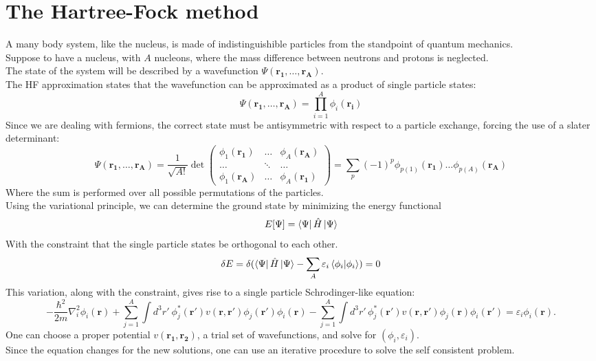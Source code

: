 \section{The Hartree-Fock method}
A many body system, like the nucleus, is made of indistinguishible particles from the standpoint of quantum mechanics.
\\Suppose to have a nucleus, with $A$ nucleons, where the mass difference between neutrons and protons is neglected.
\\The state of the system will be described by a wavefunction $\Psi(\mathbf{r_1}, \ldots, \mathbf{r_A})$.
\\The HF approximation states that the wavefunction can be approximated as a product of single particle states:
\begin{equation}
    \Psi(\mathbf{r_1}, \ldots, \mathbf{r_A}) = \prod_{i=1}^A \phi_i(\mathbf{r_i})
\end{equation}
Since we are dealing with fermions, the correct state must be antisymmetric with respect to a particle exchange, forcing the use of a slater determinant:
\begin{equation}
    \Psi(\mathbf{r_1}, \ldots, \mathbf{r_A}) = \frac{1}{\sqrt{A!}}\det
    \begin{pmatrix}
        \phi_1(\mathbf{r_1}) & \ldots & \phi_A(\mathbf{r_A}) \\
        \ldots & \ddots & \ldots \\
        \phi_1(\mathbf{r_A}) & \ldots & \phi_A(\mathbf{r_1})
    \end{pmatrix}
    =\sum_{p} (-1)^p \phi_{p(1)}(\mathbf{r_1}) \ldots \phi_{p(A)}(\mathbf{r_A})
\end{equation}
Where the sum is performed over all possible permutations of the particles.
\\Using the variational principle, we can determine the ground state by minimizing the energy functional
\begin{equation}
    \label{eq:energy_functional}
    E[\Psi] = \bra{\Psi} \hat{H} \ket{\Psi}
\end{equation}
With the constraint that the single particle states be orthogonal to each other.
\begin{equation}
    \delta E = \delta(\bra{\Psi} \hat{H} \ket{\Psi} - \sum_A \varepsilon_i\braket{\phi_i | \phi_i} ) = 0
\end{equation}
This variation, along with the constraint, gives rise to a single particle Schrodinger-like equation:
\begin{equation}
-\frac{\hbar^2}{2m} \nabla_i^2 \phi_i(\mathbf{r}) + \sum_{j=1}^A \int d^3 r' \ \phi_j^*(\mathbf{r}') v(\mathbf{r}, \mathbf{r}') \phi_j(\mathbf{r}') \phi_i(\mathbf{r}) - \sum_{j=1}^A \int d^3 r' \, \phi_j^*(\mathbf{r}') v(\mathbf{r}, \mathbf{r}') \phi_j(\mathbf{r}) \phi_i(\mathbf{r}') = \varepsilon_i \phi_i(\mathbf{r}).
\end{equation}
One can choose a proper potential $v(\mathbf{r_1}, \mathbf{r_2})$, a trial set of wavefunctions, and solve for $(\phi_i, \varepsilon_i)$.
\\Since the equation changes for the new solutions, one can use an iterative procedure to solve the self consistent problem.